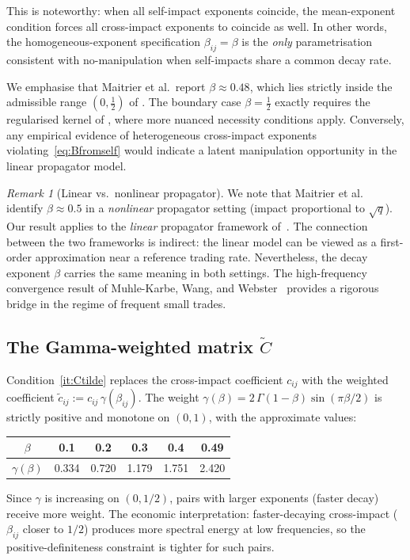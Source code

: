 \documentclass[12pt]{article}
\theoremstyle{definition}
\theoremstyle{remark}
\newtheorem{remark}[theorem]{Remark}
\newcommand{\bC}{\widetilde{C}}
\begin{document}
This is noteworthy: when all self-impact exponents coincide,
the mean-exponent condition forces all cross-impact exponents to coincide as well.
In other words, the homogeneous-exponent specification $\beta_{ij}=\beta$
is the \emph{only} parametrisation consistent with no-manipulation
when self-impacts share a common decay rate.

We emphasise that Maitrier et al.\ report $\beta\approx 0.48$,
which lies strictly inside the admissible range $(0,\tfrac12)$ of
.  The boundary case $\beta = \tfrac12$ exactly
requires the regularised kernel of ,
where more nuanced necessity conditions apply.
Conversely, any empirical evidence of heterogeneous cross-impact
exponents violating~\eqref{eq:Bfromself} would indicate a latent
manipulation opportunity in the linear propagator model.

\begin{remark}[Linear vs.\ nonlinear propagator]
We note that Maitrier et al.~\cite{MLKB2026} identify $\beta\approx 0.5$ in a
\emph{nonlinear} propagator setting (impact proportional to $\sqrt{q}$).  Our result applies
to the \emph{linear} propagator framework of~\cite{AbiJaberNeumanTuschmann2026}.
The connection between the two frameworks is indirect: the linear model can be viewed as a
first-order approximation near a reference trading rate.  Nevertheless, the decay
exponent $\beta$ carries the same meaning in both settings.
The high-frequency convergence result of Muhle-Karbe, Wang, and
Webster~\cite{MuhleKarbeWangWebster2024} provides a rigorous bridge in the
regime of frequent small trades.
\end{remark}

\subsection{The Gamma-weighted matrix \texorpdfstring{$\bC$}{C-tilde}}
\label{sec:Ctilde_discuss}

Condition~\ref{it:Ctilde} replaces the cross-impact coefficient $c_{ij}$ with the weighted
coefficient $\widetilde{c}_{ij}:= c_{ij}\,\gamma(\beta_{ij})$.  The weight
$\gamma(\beta) = 2\,\Gamma(1-\beta)\sin(\pi\beta/2)$ is strictly positive and monotone
on $(0,1)$, with the approximate values:
\begin{center}
\begin{tabular}{c|ccccc}
\toprule
$\beta$ & 0.1 & 0.2 & 0.3 & 0.4 & 0.49 \\
\midrule
$\gamma(\beta)$ & 0.334 & 0.720 & 1.179 & 1.751 & 2.420 \\
\bottomrule
\end{tabular}
\end{center}
Since $\gamma$ is increasing on $(0,1/2)$, pairs with larger exponents (faster decay) receive
more weight.  The economic interpretation: faster-decaying cross-impact ($\beta_{ij}$ closer
to $1/2$) produces more spectral energy at low frequencies, so the positive-definiteness
constraint is tighter for such pairs.
\end{document}
